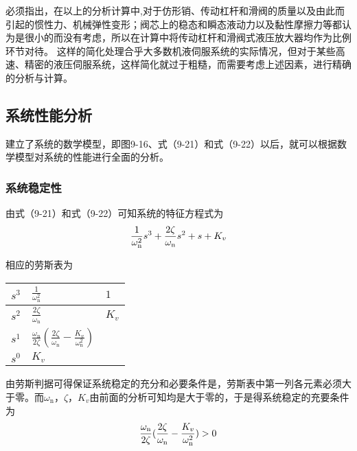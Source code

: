 必须指出，在以上的分析计算中,对于仿形销、传动杠杆和滑阀的质量以及由此而引起的惯性力、机械弹性变形；阀芯上的稳态和瞬态液动力以及黏性摩擦力等都认为是很小的而没有考虑，所以在计算中将传动杠杆和滑阀式液压放大器均作为比例环节对待。
这样的简化处理合乎大多数机液伺服系统的实际情况，但对于某些高速、精密的液压伺服系统，这样简化就过于粗糙，而需要考虑上述因素，进行精确的分析与计算。

\subsection{系统性能分析}

建立了系统的数学模型，即图9-16、式（9-21）和式（9-22）以后，就可以根据数学模型对系统的性能进行全面的分析。

\subsubsection{系统稳定性}

由式（9-21）和式（9-22）可知系统的特征方程式为
\begin{align}
    \frac{1}{\omega_{\text{n}}^2}s^3+\frac{2\zeta }{\omega_{\text{n}}}s^2+s+K_{v} \notag
\end{align}

相应的劳斯表为

\begin{table*}[!hbt]
\centering
\renewcommand\arraystretch{1.5}
\begin{tabular}{p{1cm}<{\centering}|p{2.5cm}<{\centering}p{1cm}<{\centering}}
    $s^3$   &   $\frac{1}{\omega_{\text{n}}^2}$     &   $1$ \\
    \hline
    $s^2$   &   $\frac{2\zeta}{\omega_{\text{n}}}$  &   $K_{v}$\\
    \hline
    $s^1$   &   $\frac{\omega_{\text{n}}}{2\zeta}(\frac{2\zeta}{\omega_{\text{n}}}-\frac{K_{v}}{\omega_{\text{n}}^2})$   &   \\
    \hline
    $s^0$   &   $K_{v}$                             &            \\
\end{tabular}
\end{table*}

由劳斯判据可得保证系统稳定的充分和必要条件是，劳斯表中第一列各元素必须大于零。而$\omega_{\text{n}}$，$\zeta $，$K_{v}$由前面的分析可知均是大于零的，于是得系统稳定的充要条件为
\begin{align}
    \frac{\omega_{\text{n}}}{2\zeta }(\frac{2\zeta }{\omega_{\text{n}}}-\frac{K_{v}}{\omega_{\text{n}}^2})>0 \notag
\end{align}

